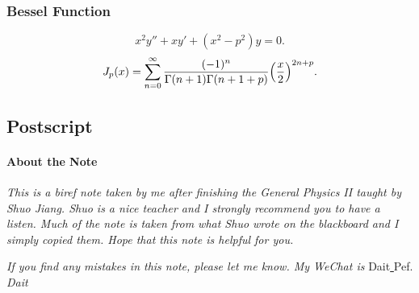 \documentclass{article}
\begin{document}
\subsubsection{Bessel Function}
$$x^2y''+xy'+(x^2-p^2)y=0.$$
$$J_p(x)=\sum_{n=0}^\infty\frac{(-1)^n}{\Gamma(n+1)\Gamma(n+1+p)}\Bigl(\frac x2\Bigr)^{2n+p}.$$
\clearpage
\subsection*{Postscript}
\paragraph{About the Note} \textit{This is a biref note taken by me after finishing the General Physics II taught by Shuo Jiang. Shuo is a nice teacher and I strongly recommend you to have a listen. Much of the note is taken from what Shuo wrote on the blackboard and I simply copied them. Hope that this note is helpful for you.}
\par\textit{If you find any mistakes in this note, please let me know. My WeChat is }Dait\underline{ }Pef.
\hfill\textit{Dait}
\printindex
\end{document}
